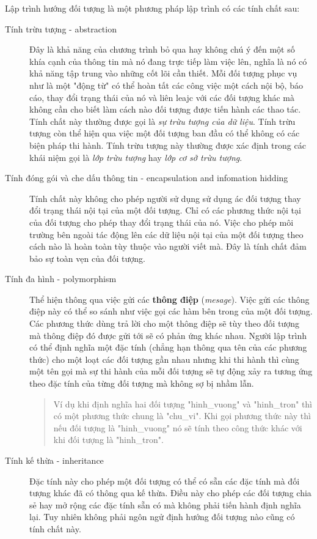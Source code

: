 \documentclass[10pt, a4paper]{article}
\begin{document}
Lập trình hướng đối tượng là một phương pháp lập trình có các tính chất sau:

\begin{description}
\item[Tính trừu tượng - abstraction] Đây là khả năng của chương trình bỏ qua hay không chú ý đến một số khía cạnh của thông tin mà nó đang trực tiếp làm việc lên, nghĩa là nó có khả năng tập trung vào những cốt lõi cần thiết.  Mỗi đối tượng phục vụ như là một "động từ" có thể hoàn tất các công việc một cách nội bộ, báo cáo, thay đổi trạng thái của nó và liên leajc với các đối tượng khác mà không cần cho biết làm cách nào đối tượng được tiến hành các thao tác. Tính chất này thường được gọi là \emph{sự trừu tượng của dữ liệu}. Tính trừu tượng còn thể hiện qua việc một đối tượng ban đầu có thể không có các biện pháp thi hành. Tính trừu tượng này thường được xác định trong các khái niệm gọi là \emph{lớp trừu tượng} hay \emph{lớp cơ sở trừu tượng}.
\item[Tính đóng gói và che dấu thông tin - encapsulation and infomation hidding] Tính chất này không cho phép người sử dụng sử dụng ác đối tượng thay đổi trạng thái nội tại của một đối tượng. Chỉ có các phương thức nội tại của đối tượng cho phép thay đổi trạng thái của nó. Việc cho phép môi trường bên ngoài tác động lên các dữ liệu nội tại của một đối tượng theo cách nào là hoàn toàn tùy thuộc vào người viết mà. Đây là tính chất đảm bảo sự toàn vẹn của đối tượng.
\item[Tính đa hình - polymorphism] Thể hiện thông qua việc gửi các {\bf thông điệp} ({\it mesage}). Việc gửi các thông điệp này có thể so sánh như việc gọi các hàm bên trong của một đối tượng. Các phương thức dùng trả lời cho một thông điệp sẽ tùy theo đối tượng mà thông điệp đó được gửi tới sẽ có phản ứng khác nhau. Người lập trình có thể định nghĩa một đặc tính (chẳng hạn thông qua tên của các phương thức) cho một loạt các đối tượng gần nhau nhưng khi thi hành thì cùng một tên gọi mà sự thi hành của mỗi đối tượng sẽ tự động xảy ra tương ứng theo đặc tính của từng đối tượng mà không sợ bị nhầm lẫn.
\begin{quotation}
Ví dụ khi định nghĩa hai đối tượng "hinh\_vuong" và "hinh\_tron" thì có một phương thức chung là "chu\_vi". Khi gọi phương thức này thì nếu đối tượng là "hinh\_vuong" nó sẽ tính theo công thức khác với khi đối tượng là "hinh\_tron".
\end{quotation}
\item[Tính kế thừa - inheritance] Đặc tính này cho phép một đối tượng có thể có sẵn các đặc tính mà đối tượng khác đã có thông qua kế thừa. Điều này cho phép các đối tượng chia sẻ hay mở rộng các đặc tính sẵn có mà không phải tiến hành định nghĩa lại. Tuy nhiên không phải ngôn ngử định hướng đối tượng nào cũng có tính chất này.
\end{description}
\end{document}
